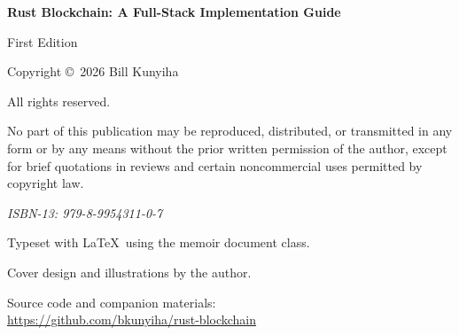 \thispagestyle{empty}

\vspace*{\fill}

\begin{raggedright}
\small\sffamily

{\bfseries\color{chaptertitle} Rust Blockchain: A Full-Stack Implementation Guide}

{\color{brandgray} First Edition}

\medskip\medskip

Copyright \copyright\ 2026 Bill Kunyiha

\smallskip

All rights reserved.

\medskip

No part of this publication may be reproduced, distributed, or transmitted in any
form or by any means without the prior written permission of the author, except for
brief quotations in reviews and certain noncommercial uses permitted by copyright law.

\medskip\medskip

{\color{sectioncolor}\small\itshape ISBN-13: 979-8-9954311-0-7}

\smallskip

Typeset with \LaTeX\ using the memoir document class.

\smallskip

Cover design and illustrations by the author.

\medskip\medskip

Source code and companion materials:\\
\url{https://github.com/bkunyiha/rust-blockchain}

\medskip

\hspace*{0.5em}

\end{raggedright}

\vspace*{\fill}
\cleardoublepage
